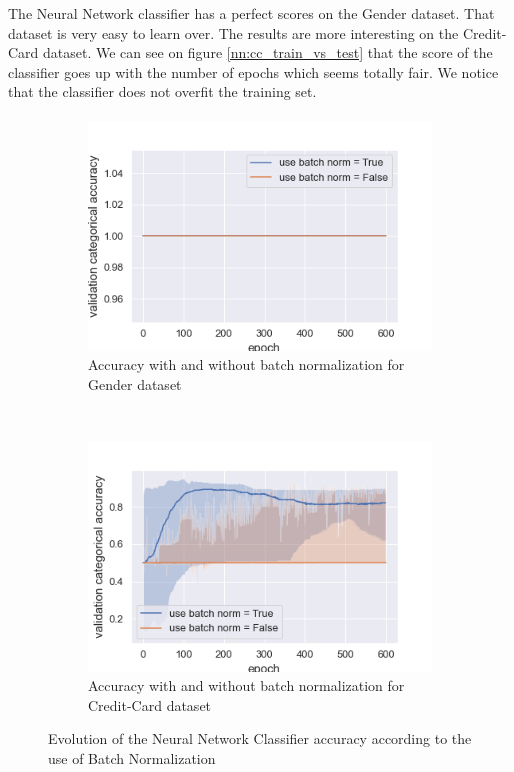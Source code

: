 \documentclass[10pt]{article}
\begin{document}
			The Neural Network classifier has a perfect scores on the Gender dataset. That dataset is very easy to learn over. The results are more interesting on the Credit-Card dataset. We can see on figure \ref{nn:cc_train_vs_test} that the score of the classifier goes up with the number of epochs which seems totally fair. We notice that the classifier does not overfit the training set.
		\paragraph*{}
			\begin{figure}[h]
				\centering
				\begin{subfigure}[]{0.45\columnwidth}
					\centering
					\includegraphics[width=\linewidth]{../graphics/per_gender_epoch_score_type_use_batch_norm.png}
					\caption{Accuracy with and without batch normalization for Gender dataset}
					\label{nn:g_bn}
				\end{subfigure}
				~
				\begin{subfigure}[]{0.45\columnwidth}
					\centering
					\includegraphics[width=\linewidth]{../graphics/per_creditcard_epoch_score_type_use_batch_norm.png}
					\caption{Accuracy with and without batch normalization for Credit-Card dataset}
					\label{nn:cc_bn}
				\end{subfigure}
				\caption{Evolution of the Neural Network Classifier accuracy according to the use of Batch Normalization}
				\label{nn:bn}
			\end{figure}
\end{document}
